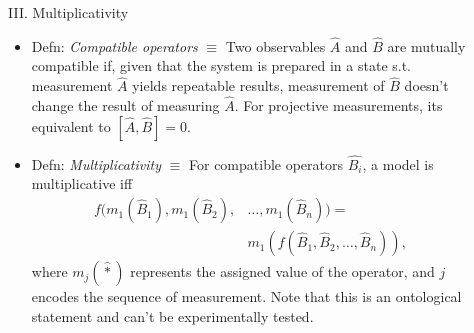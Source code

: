 \documentclass[final,hyperref={pdfpagelabels=false}]{beamer}
\begin{document}
\begin{frame}[t]
\begin{columns}[c]
\begin{column}{.31\textwidth}


    \end{column}

    \begin{column}{.69\textwidth}
      \begin{columns}[c]

        \begin{column}{.012\textwidth}\end{column} %
        \begin{column}{.48\textwidth} %



          \begin{block}{III. Multiplicativity}
            \begin{itemize}

            \item Defn: \emph{Compatible operators} $\equiv$ Two observables $\hat A$ and $\hat B$ are mutually compatible if, given that the system is prepared in a state s.t. measurement $\hat A$ yields repeatable results, measurement of $\hat B$ doesn't change the result of measuring $\hat A$. For projective measurements, its equivalent to $[\hat A, \hat B]=0$. %
              
            \item Defn: \emph{Multiplicativity} $\equiv$ For compatible operators $\hat{B_i}$, a model is multiplicative iff 
              \begin{align} f(m_1(\hat{B}_1),m_1(\hat{B}_2),&\dots,m_1(\hat{B}_n)) = \\
                                                            &m_1(f(\hat{B}_1,\hat{B}_2,\dots,\hat{B}_n)),
              \end{align}
              where $m_j(\hat *)$ represents the assigned value of the operator, and $j$ encodes the sequence of measurement. Note that this is an ontological statement and can't be experimentally tested.


\end{itemize}
\end{block}
\end{column}
\end{columns}
\end{column}
\end{columns}
\end{frame}
\end{document}

